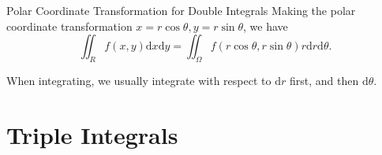 \begin{proposition}{Polar Coordinate Transformation for Double Integrals}{}
  Making the polar coordinate transformation $x = r\cos\theta, y = r \sin
  \theta$,
  we have
  \begin{equation}
    \iint_R f(x, y)\mathrm{d} x \mathrm{d} y = \iint_{\Omega}f(r \cos \theta, r \sin \theta) r \mathrm{d} r \mathrm{d} \theta.
  \end{equation}
\end{proposition}

\begin{note}
  When integrating, we usually integrate with respect to $\mathrm{d} r$ first,
  and then $\mathrm{d} \theta$.
\end{note}


\section{Triple Integrals}








